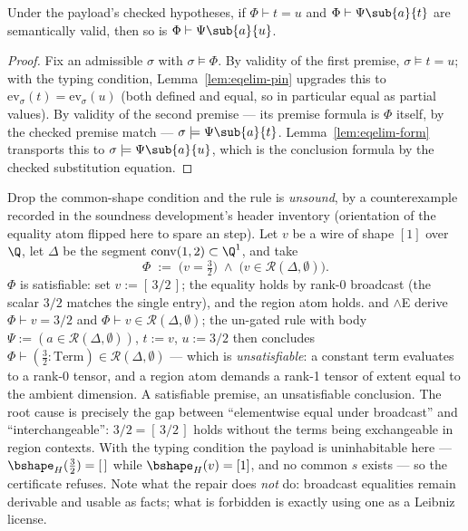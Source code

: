 \begin{bthm}\label{thm:eqelim-sound}
Under the payload's checked hypotheses, if $\Phi \vdash t = u$ and
$\Phi \vdash \Psi\sub{a}{t}$ are semantically valid, then so is
$\Phi \vdash \Psi\sub{a}{u}$.
\end{bthm}
\begin{proof}
Fix an admissible $\sigma$ with $\sigma \models \Phi$. By validity of the
first premise, $\sigma \models t = u$; with the typing condition,
Lemma~\ref{lem:eqelim-pin} upgrades this to
$\mathrm{ev}_\sigma(t) = \mathrm{ev}_\sigma(u)$ (both defined and equal,
so in particular equal as partial values). By validity of the second
premise --- its premise formula is $\Phi$ itself, by the checked premise
match --- $\sigma \models \Psi\sub{a}{t}$. Lemma~\ref{lem:eqelim-form}
transports this to $\sigma \models \Psi\sub{a}{u}$, which is the
conclusion formula by the checked substitution equation.
\end{proof}

\begin{bremark}
\label{rem:eqelim-cex}
Drop the common-shape condition and the rule is \emph{unsound}, by a
counterexample recorded in the soundness development's header inventory
(orientation of the equality atom flipped here to spare an
 step). Let $v$ be a wire of shape $[1]$ over $\Q$, let
$\Delta$ be the segment $\mathrm{conv}(1,2) \subset \Q^1$, and take
\[
\Phi \;:=\; \bigl(v = \tfrac{3}{2}\bigr) \;\wedge\; \bigl(v \in
\mathcal{R}(\Delta, \emptyset)\bigr).
\]
$\Phi$ is satisfiable: set $v := [\,3/2\,]$; the equality holds by rank-0
broadcast (the scalar $3/2$ matches the single entry), and the region
atom holds.  and $\wedge$E derive $\Phi \vdash v = 3/2$ and
$\Phi \vdash v \in \mathcal{R}(\Delta, \emptyset)$; the un-gated rule
with body $\Psi := (a \in \mathcal{R}(\Delta, \emptyset))$, $t := v$,
$u := 3/2$ then concludes
$\Phi \vdash (\tfrac{3}{2} : \mathrm{Term}) \in \mathcal{R}(\Delta,
\emptyset)$ --- which is \emph{unsatisfiable}: a constant term evaluates
to a rank-0 tensor, and a region atom demands a rank-1 tensor of extent
equal to the ambient dimension. A satisfiable premise, an unsatisfiable
conclusion. The root cause is precisely the gap between ``elementwise
equal under broadcast'' and ``interchangeable'': $3/2 = [\,3/2\,]$ holds
without the terms being exchangeable in region contexts. With the typing
condition the payload is uninhabitable here ---
$\bshape_H(\tfrac{3}{2}) = [\,]$ while $\bshape_H(v) = [1]$, and no
common $s$ exists --- so the certificate refuses. Note what the repair
does \emph{not} do: broadcast equalities remain derivable and usable as
facts; what is forbidden is exactly using one as a Leibniz license.
\end{bremark}

